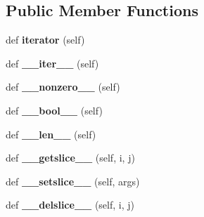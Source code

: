 \subsection*{Public Member Functions}
\begin{DoxyCompactItemize}
\item 
def {\bfseries iterator} (self)\hypertarget{classsbol_1_1libsbol_1_1___int_vector_a30ba1f101f39548911d393c56f869320}{}\label{classsbol_1_1libsbol_1_1___int_vector_a30ba1f101f39548911d393c56f869320}

\item 
def {\bfseries \+\_\+\+\_\+iter\+\_\+\+\_\+} (self)\hypertarget{classsbol_1_1libsbol_1_1___int_vector_aab14531083d7636c7370abbb9e292fbb}{}\label{classsbol_1_1libsbol_1_1___int_vector_aab14531083d7636c7370abbb9e292fbb}

\item 
def {\bfseries \+\_\+\+\_\+nonzero\+\_\+\+\_\+} (self)\hypertarget{classsbol_1_1libsbol_1_1___int_vector_a616908f8b3c57809b8eecef287cf246c}{}\label{classsbol_1_1libsbol_1_1___int_vector_a616908f8b3c57809b8eecef287cf246c}

\item 
def {\bfseries \+\_\+\+\_\+bool\+\_\+\+\_\+} (self)\hypertarget{classsbol_1_1libsbol_1_1___int_vector_af38a7af3dabbed3f4ad48c8e692c1a34}{}\label{classsbol_1_1libsbol_1_1___int_vector_af38a7af3dabbed3f4ad48c8e692c1a34}

\item 
def {\bfseries \+\_\+\+\_\+len\+\_\+\+\_\+} (self)\hypertarget{classsbol_1_1libsbol_1_1___int_vector_aea3cb512e66709faa42edf9e63d38128}{}\label{classsbol_1_1libsbol_1_1___int_vector_aea3cb512e66709faa42edf9e63d38128}

\item 
def {\bfseries \+\_\+\+\_\+getslice\+\_\+\+\_\+} (self, i, j)\hypertarget{classsbol_1_1libsbol_1_1___int_vector_ae872dc71848917a7fc3fd50cc421cddf}{}\label{classsbol_1_1libsbol_1_1___int_vector_ae872dc71848917a7fc3fd50cc421cddf}

\item 
def {\bfseries \+\_\+\+\_\+setslice\+\_\+\+\_\+} (self, args)\hypertarget{classsbol_1_1libsbol_1_1___int_vector_afcaa46750316e12419521393fbf49e2a}{}\label{classsbol_1_1libsbol_1_1___int_vector_afcaa46750316e12419521393fbf49e2a}

\item 
def {\bfseries \+\_\+\+\_\+delslice\+\_\+\+\_\+} (self, i, j)\hypertarget{classsbol_1_1libsbol_1_1___int_vector_a0ae6d5fa2290ff5f00c0f153b3165f39}{}\label{classsbol_1_1libsbol_1_1___int_vector_a0ae6d5fa2290ff5f00c0f153b3165f39}


\end{DoxyCompactItemize}
